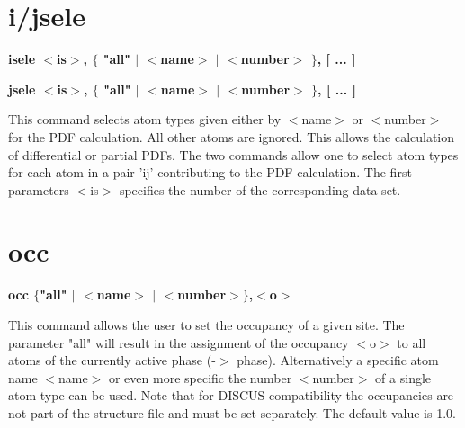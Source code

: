 \section{i/jsele}
{\bf isele $ <$is$> $, $ \{$ "all" $| $ $ <$name$> $ $| $ $ <$number$> $ $\} $, [ ... ] \par }
{\bf jsele $ <$is$> $, $ \{$ "all" $| $ $ <$name$> $ $| $ $ <$number$> $ $\} $, [ ... ] \par }
\par
\vspace{3pt}
This command selects atom types given either by $ <$name$> $ or $ <$number$> $ 
for the PDF calculation. All other atoms are ignored. This allows 
the calculation of differential or partial PDFs. The two commands 
allow one to select atom types for each atom in a pair 'ij' 
contributing to the PDF calculation. The first parameters $ <$is$> $ 
specifies the number of the corresponding data set. 
\section{occ}
{\bf occ $ \{$"all" $| $ $ <$name$> $ $| $ $ <$number$> $$\} $,$ <$o$> $ \par }
\par
\vspace{3pt}
This command allows the user to set the occupancy of a given 
site. The parameter "all" will result in the assignment of 
the occupancy $ <$o$> $ to all atoms of the currently active phase 
(-$> $ phase). Alternatively a specific atom name $ <$name$> $ or even 
more specific the number $ <$number$> $ of a single atom type can be 
used. Note that for DISCUS compatibility the occupancies are 
not part of the structure file and must be set separately. 
The default value is 1.0. 
